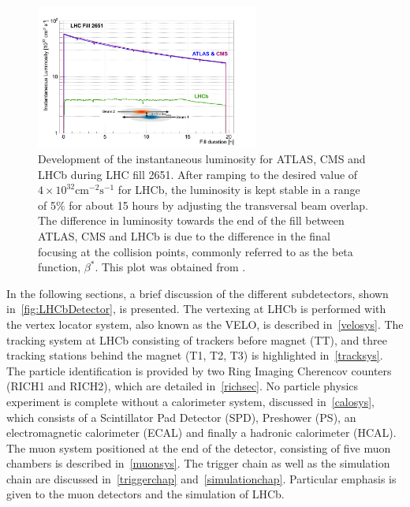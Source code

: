 \begin{figure}
	\centering
        \includegraphics[width = 0.65\textwidth]{figs/detector/lumicompare.png}%
	\caption{Development of the instantaneous luminosity for \Gls{ATLAS}, \Gls{CMS} and \Gls{LHCb} during LHC fill 2651. After ramping to the desired value of $4\times10^{32}\mathrm{cm^{-2}s^{-1}}$
for LHCb, the luminosity is kept stable in a range of 5$\%$ for about 15 hours by adjusting the transversal beam overlap. The difference in luminosity towards the end of the fill between ATLAS, \Gls{CMS} and \Gls{LHCb} is due to the difference in the final focusing at the collision points, commonly referred to as the beta function, $\beta^{*}$. This plot was obtained from \cite{LHCb-DP-2014-002}.}
	\label{fig:lhcbintlumi}
\end{figure}

In the following sections, a brief discussion of the different subdetectors, shown in~\autoref{fig:LHCbDetector}, is presented. The vertexing at \gls{LHCb} is performed with the vertex locator system, also known as the VELO, is described in~\autoref{velosys}. The tracking system at \gls{LHCb} consisting of trackers before magnet (TT), and three tracking stations behind the magnet (T1, T2, T3) is highlighted in~\autoref{tracksys}. The particle identification is provided by two Ring Imaging Cherencov counters (RICH1 and RICH2), which are detailed in~\autoref{richsec}. No particle physics experiment is complete without a calorimeter system, discussed in~\autoref{calosys}, which consists of a Scintillator Pad Detector (SPD), Preshower (PS), an electromagnetic calorimeter (ECAL) and finally a hadronic calorimeter (HCAL). The muon system positioned at the end of the detector, consisting of five muon chambers is described in~\autoref{muonsys}. The trigger chain as well as the simulation chain are discussed in~\autoref{triggerchap} and~\autoref{simulationchap}. Particular emphasis is given to the muon detectors and the simulation of \gls{LHCb}.

